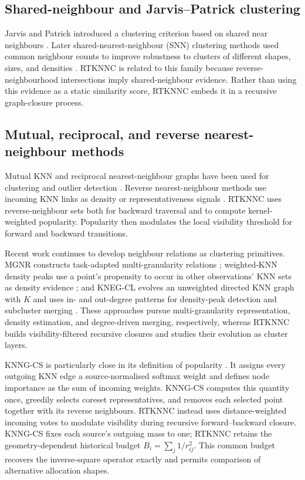 \documentclass[pdflatex,sn-mathphys-num]{sn-jnl}
\begin{document}
\subsection{Shared-neighbour and Jarvis--Patrick clustering}

Jarvis and Patrick introduced a clustering criterion based on shared near neighbours \citep{JarvisPatrick1973}. Later shared-nearest-neighbour (SNN) clustering methods used common neighbour counts to improve robustness to clusters of different shapes, sizes, and densities \citep{Ertoz2003SNN}. RTKNNC is related to this family because reverse-neighbourhood intersections imply shared-neighbour evidence. Rather than using this evidence as a static similarity score, RTKNNC embeds it in a recursive graph-closure process.

\subsection{Mutual, reciprocal, and reverse nearest-neighbour methods}

Mutual KNN and reciprocal nearest-neighbour graphs have been used for clustering and outlier detection \citep{BritoChavezQuirozYukich1997,GowdaKrishna1978,SardanaBhatnagar2014}. Reverse nearest-neighbour methods use incoming KNN links as density or representativeness signals \citep{ChowdhuryAmorim2018}. RTKNNC uses reverse-neighbour sets both for backward traversal and to compute kernel-weighted popularity. Popularity then modulates the local visibility threshold for forward and backward transitions.

Recent work continues to develop neighbour relations as clustering primitives.
MGNR constructs task-adapted multi-granularity relations
\citep{XieEtAl2024MGNR}; weighted-KNN density peaks use a point's propensity to
occur in other observations' KNN sets as density evidence
\citep{DingEtAl2024WeightedKNN}; and KNEG-CL evolves an unweighted directed KNN
graph with $K$ and uses in- and out-degree patterns for density-peak detection
and subcluster merging \citep{FeiEtAl2025KNEGCL}. These approaches pursue
multi-granularity representation, density estimation, and degree-driven
merging, respectively, whereas RTKNNC builds visibility-filtered recursive
closures and studies their evolution as cluster layers.

KNNG-CS is particularly close in its definition of popularity \citep{LiuEtAl2026KNNGCS}. It assigns every outgoing KNN edge a source-normalised softmax weight and defines node importance as the sum of incoming weights. KNNG-CS computes this quantity once, greedily selects coreset representatives, and removes each selected point together with its reverse neighbours. RTKNNC instead uses distance-weighted incoming votes to modulate visibility during recursive forward--backward closure. KNNG-CS fixes each source's outgoing mass to one; RTKNNC retains the geometry-dependent historical budget $B_i=\sum_j 1/r_{ij}^2$. This common budget recovers the inverse-square operator exactly and permits comparison of alternative allocation shapes.
\end{document}
